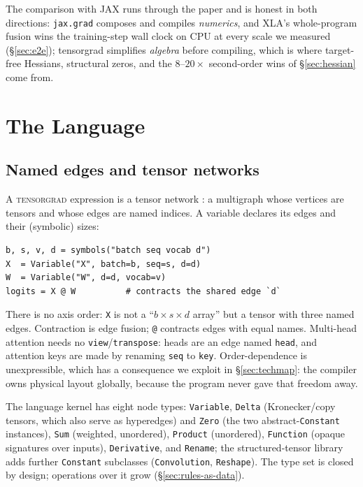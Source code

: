 \documentclass[sigplan,10pt,review]{acmart}
\begin{document}
The comparison with JAX runs through the paper and is honest in both
directions: \texttt{jax.grad} composes and compiles \emph{numerics},
and XLA's whole-program fusion wins the training-step wall clock on CPU
at every scale we measured (\S\ref{sec:e2e}); tensorgrad simplifies
\emph{algebra} before compiling, which is where target-free Hessians,
structural zeros, and the $8$--$20\times$ second-order wins of
\S\ref{sec:hessian} come from.

\section{The Language}\label{sec:language}

\subsection{Named edges and tensor networks}

A \textsc{tensorgrad} expression is a tensor network \cite{penrose1971,tensorcookbook}: a multigraph whose
vertices are tensors and whose edges are named indices. A variable
declares its edges and their (symbolic) sizes:

\begin{lstlisting}
b, s, v, d = symbols("batch seq vocab d")
X  = Variable("X", batch=b, seq=s, d=d)
W  = Variable("W", d=d, vocab=v)
logits = X @ W          # contracts the shared edge `d`
\end{lstlisting}

There is no axis order: \texttt{X} is not a ``$b \times s \times d$
array'' but a tensor with three named edges. Contraction is edge fusion;
\texttt{@} contracts edges with equal names. Multi-head attention needs no
\texttt{view}/\texttt{transpose}: heads are an edge named \texttt{head},
and attention keys are made by renaming \texttt{seq} to \texttt{key}.
Order-dependence is unexpressible, which has a consequence we exploit in
\S\ref{sec:techmap}: the compiler owns physical layout globally, because
the program never gave that freedom away.

The language kernel has eight node types: \texttt{Variable},
\texttt{Delta} (Kronecker/copy tensors, which also serve as hyperedges)
and \texttt{Zero} (the two abstract-\texttt{Constant} instances),
\texttt{Sum} (weighted, unordered), \texttt{Product} (unordered),
\texttt{Function} (opaque signatures over inputs), \texttt{Derivative},
and \texttt{Rename}; the structured-tensor library adds further
\texttt{Constant} subclasses (\texttt{Convolution}, \texttt{Reshape}).
The type set is closed by design; operations over it grow
(\S\ref{sec:rules-as-data}).
\end{document}

